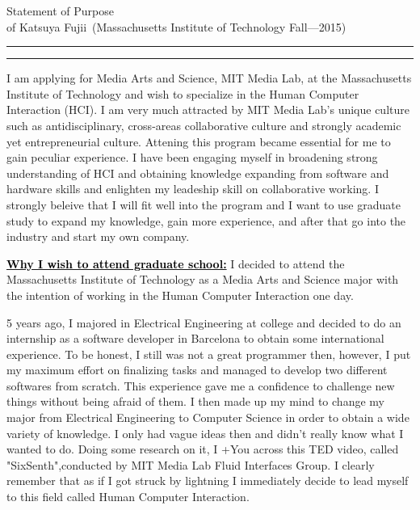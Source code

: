 \documentclass{article}
\newcommand{\soptitle}{Statement of Purpose}
\newcommand{\yourname}{Katsuya Fujii}
\newcommand{\statement}[1]{\par\medskip
  \underline{\textcolor{black}{\textbf{#1:}}}\space
}
\begin{document}
\begin{center}\LARGE\soptitle\\
\large of \yourname\ (Massachusetts Institute of Technology Fall---2015)
\end{center}

\hrule
\vspace{1pt}
\hrule height 1pt

\bigskip


I am applying for Media Arts and Science, MIT Media Lab, at the Massachusetts Institute of Technology and wish to specialize in the Human Computer Interaction (HCI). I am very much attracted by MIT Media Lab's unique culture such as antidisciplinary, cross-areas collaborative culture and strongly academic yet entrepreneurial culture. Attening this program became essential for me to gain peculiar experience. I have been engaging myself in broadening strong understanding of HCI and obtaining knowledge expanding from software and hardware skills and enlighten my leadeship skill on collaborative working. I strongly beleive that I will fit well into the program and I want to use graduate study to expand my knowledge, gain more experience, and after that go into the industry and start my own company.

\statement{Why I wish to attend graduate school} I decided to attend the Massachusetts Institute of Technology as a Media Arts and Science major with the intention of working in the Human Computer Interaction one day. 

5 years ago, I majored in Electrical Engineering at college and decided to do an internship as a software developer in Barcelona to obtain some international experience.  To be honest, I still was not a great programmer then, however, I put my maximum effort on finalizing tasks and managed to develop two different softwares from scratch. This experience gave me a confidence to challenge new things without being afraid of them. I then made up my mind to change my major from Electrical Engineering to Computer Science in order to obtain a wide variety of knowledge. I only had vague ideas then and didn't really know what I wanted to do. Doing some research on it, I +You across this TED video, called "SixSenth",conducted by MIT Media Lab Fluid Interfaces Group. I clearly remember that as if I got struck by lightning I immediately decide to lead myself to this field called Human Computer Interaction. 
\end{document}
